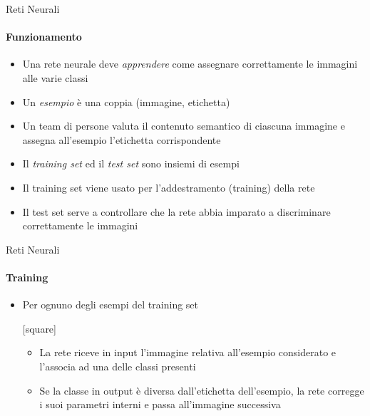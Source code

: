 \documentclass[
 ]{beamer}
\begin{document}
\begin{frame}{Reti Neurali}
    \framesubtitle{Funzionamento}
    \begin{itemize} [<+->]
        \setlength\itemsep{1em}
        \item \large Una rete neurale deve \emph{apprendere} come assegnare correttamente le immagini alle varie classi
        \item \large Un \emph{esempio} è una coppia (immagine, etichetta)
        \item \large Un team di persone valuta il contenuto semantico di ciascuna immagine e assegna all'esempio l'etichetta corrispondente
        \item \large Il \emph{training set} ed il \emph{test set} sono insiemi di esempi
        \item \large Il training set viene usato per l'addestramento (training) della rete
        \item \large Il test set serve a controllare che la rete abbia imparato a discriminare correttamente le immagini
       
    \end{itemize}
\end{frame}

\begin{frame}{Reti Neurali}
    \framesubtitle{Training}
    \begin{itemize} [<+->]
        \setlength\itemsep{2em}
        \item \large Per ognuno degli esempi del training set
        
        \bigskip
        \bigskip
        
        [square] 
        \begin{itemize} 
        \setlength\itemsep{3em}
            \item \large La rete riceve in input l'immagine relativa all'esempio considerato e l'associa ad una delle classi presenti
            \item \large Se la classe in output è diversa dall'etichetta dell'esempio, la rete corregge i suoi parametri interni e passa all'immagine successiva
        \end{itemize}
    \end{itemize}
\end{frame}
\end{document}
